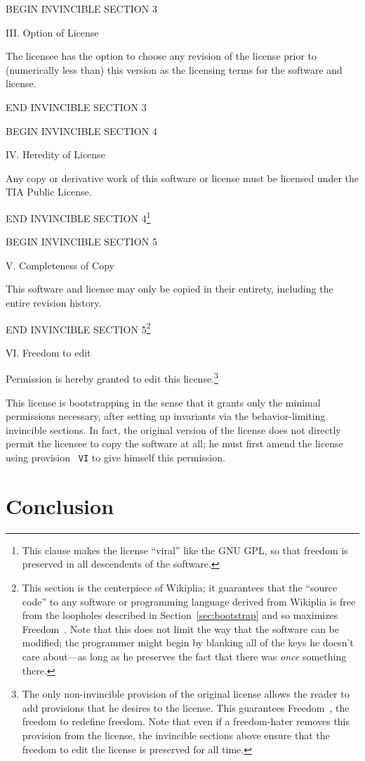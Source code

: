 \documentclass[twocolumn]{article}
\begin{document}
{BEGIN INVINCIBLE SECTION 3

III. Option of License

The licensee has the option to choose any revision of the license
prior to (numerically less than) this version as the licensing
terms for the software and license.

END INVINCIBLE SECTION 3

BEGIN INVINCIBLE SECTION 4

IV. Heredity of License

Any copy or derivative work of this software or license must be
licensed under the TIA Public License.

END INVINCIBLE SECTION 4\footnote{This clause makes the license
``viral'' like the GNU GPL, so that freedom is preserved in all
descendents of the software.}

BEGIN INVINCIBLE SECTION 5

V. Completeness of Copy

This software and license may only be copied in their entirety,
including the entire revision history.

END INVINCIBLE SECTION 5\footnote{This section is the centerpiece of
Wikiplia; it guarantees that the ``source code'' to any software or
programming language derived from Wikiplia is free from the loopholes
described in Section~\ref{sec:bootstrap} and so maximizes
Freedom~\ftinker. Note that this does not limit the way that the
software can be modified; the programmer might begin by blanking all
of the keys he doesn't care about---as long as he preserves the fact
that there was {\em once} something there.}

VI. Freedom to edit

Permission is hereby granted to edit this license.\footnote{The only
non-invincible provision of the original license allows the reader to
add provisions that he desires to the license. This guarantees
Freedom~\ffree, the freedom to redefine freedom.
%
Note that even if a freedom-hater removes this provision from the
license, the invincible sections above ensure that the freedom to edit
the license is preserved for all time.}

}

\bigskip
This license is bootstrapping in the sense that it grants only the
minimal permissions necessary, after setting up invariants via the
behavior-limiting invincible sections. In fact, the original version
of the license does not directly permit the licensee to copy the
software at all; he must first amend the license using provision {\tt
VI} to give himself this permission.

\section{Conclusion} \label{sec:conc}

\end{document}
